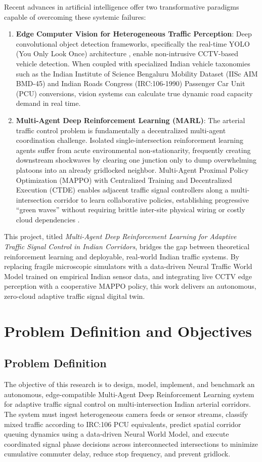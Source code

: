 \documentclass[12pt,a4paper,oneside]{report}
\begin{document}
Recent advances in artificial intelligence offer two transformative paradigms capable of overcoming these systemic failures:
\begin{enumerate}
    \item \textbf{Edge Computer Vision for Heterogeneous Traffic Perception}: Deep convolutional object detection frameworks, specifically the real-time YOLO (You Only Look Once) architecture \cite{ref_yolov8}, enable non-intrusive CCTV-based vehicle detection. When coupled with specialized Indian vehicle taxonomies such as the Indian Institute of Science Bengaluru Mobility Dataset (IISc AIM BMD-45) and Indian Roads Congress (IRC:106-1990) Passenger Car Unit (PCU) conversions, vision systems can calculate true dynamic road capacity demand in real time.
    \item \textbf{Multi-Agent Deep Reinforcement Learning (MARL)}: The arterial traffic control problem is fundamentally a decentralized multi-agent coordination challenge. Isolated single-intersection reinforcement learning agents suffer from acute environmental non-stationarity, frequently creating downstream shockwaves by clearing one junction only to dump overwhelming platoons into an already gridlocked neighbor. Multi-Agent Proximal Policy Optimization (MAPPO) with Centralized Training and Decentralized Execution (CTDE) enables adjacent traffic signal controllers along a multi-intersection corridor to learn collaborative policies, establishing progressive ``green waves'' without requiring brittle inter-site physical wiring or costly cloud dependencies \cite{ref_mappo2022}.
\end{enumerate}

This project, titled \textit{Multi-Agent Deep Reinforcement Learning for Adaptive Traffic Signal Control in Indian Corridors}, bridges the gap between theoretical reinforcement learning and deployable, real-world Indian traffic systems. By replacing fragile microscopic simulators with a data-driven Neural Traffic World Model trained on empirical Indian sensor data, and integrating live CCTV edge perception with a cooperative MAPPO policy, this work delivers an autonomous, zero-cloud adaptive traffic signal digital twin.

\section{Problem Definition and Objectives}
\label{sec:problem_def_obj}

\subsection{Problem Definition}
The objective of this research is to design, model, implement, and benchmark an autonomous, edge-compatible Multi-Agent Deep Reinforcement Learning system for adaptive traffic signal control on multi-intersection Indian arterial corridors. The system must ingest heterogeneous camera feeds or sensor streams, classify mixed traffic according to IRC:106 PCU equivalents, predict spatial corridor queuing dynamics using a data-driven Neural World Model, and execute coordinated signal phase decisions across interconnected intersections to minimize cumulative commuter delay, reduce stop frequency, and prevent gridlock.
\end{document}
